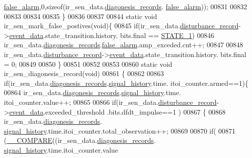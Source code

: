 \begin{DoxyCode}
      \hyperlink{a00017_a799f50625c0c03f9404a59287810113d}{false\_alarm},0,\textcolor{keyword}{sizeof}(ir\_sen\_data.\hyperlink{a00023_a7ae905b560513ad201e58c2f63375030}{diagonesis\_records}.
      \hyperlink{a00017_a799f50625c0c03f9404a59287810113d}{false\_alarm}));
00831      
00832 
00833 
00834 
00835 \}
00836 
00837 
00844  \textcolor{keyword}{static} \textcolor{keywordtype}{void} ir\_sen\_mark\_false\_postives(\textcolor{keywordtype}{void})\{
00845         \textcolor{keywordflow}{if}(ir\_sen\_data.\hyperlink{a00023_ac9b38e2c1d3f1013a88d33506c754152}{disturbance\_record}->\hyperlink{a00028_a8c0bda69e71ef674e60da47ad0be9ab0}{event\_data}.state\_transition.history.
      bits.final == \hyperlink{a00021_a727351838367f27ac0adb9a13422c342}{STATE\_1})
00846             ir\_sen\_data.\hyperlink{a00023_a7ae905b560513ad201e58c2f63375030}{diagonesis\_records}.\hyperlink{a00017_a799f50625c0c03f9404a59287810113d}{false\_alarm}.amp\_exceded.cnt++;
00847         
00848         ir\_sen\_data.\hyperlink{a00023_ac9b38e2c1d3f1013a88d33506c754152}{disturbance\_record}->\hyperlink{a00028_a8c0bda69e71ef674e60da47ad0be9ab0}{event\_data}.state\_transition.history.
      bits.final = 0;
00849 
00850 \}
00851 
00852 
00853 
00860  \textcolor{keyword}{static} \textcolor{keywordtype}{void} ir\_sen\_diagonesis\_record(\textcolor{keywordtype}{void})
00861  \{
00862 
00863               \textcolor{keywordflow}{if}(ir\_sen\_data.\hyperlink{a00023_a7ae905b560513ad201e58c2f63375030}{diagonesis\_records}.\hyperlink{a00017_affb63906d23cb1cb7787d61eaaedfb60}{signal\_history}.time.
      itoi\_counter.armed==1)\{
00864                ir\_sen\_data.\hyperlink{a00023_a7ae905b560513ad201e58c2f63375030}{diagonesis\_records}.\hyperlink{a00017_affb63906d23cb1cb7787d61eaaedfb60}{signal\_history}.time.
      itoi\_counter.value++;
00865 
00866                \textcolor{keywordflow}{if}(ir\_sen\_data.\hyperlink{a00023_ac9b38e2c1d3f1013a88d33506c754152}{disturbance\_record}->\hyperlink{a00028_a8c0bda69e71ef674e60da47ad0be9ab0}{event\_data}.exceeded\_threshold
      .bits.dfdt\_impulse==1 )
00867                 \{
00868                      ir\_sen\_data.\hyperlink{a00023_a7ae905b560513ad201e58c2f63375030}{diagonesis\_records}.
      \hyperlink{a00017_affb63906d23cb1cb7787d61eaaedfb60}{signal\_history}.time.itoi\_counter.total\_observation++;
00869 
00870                      \textcolor{keywordflow}{if}(
00871                         (\hyperlink{a00021_a1aaf79017d1250538fff385827b7401e}{\_\_COMPARE}((ir\_sen\_data.\hyperlink{a00023_a7ae905b560513ad201e58c2f63375030}{diagonesis\_records}.
      \hyperlink{a00017_affb63906d23cb1cb7787d61eaaedfb60}{signal\_history}.time.itoi\_counter.value

\end{DoxyCode}
